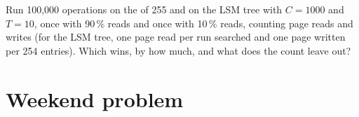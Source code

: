 \begin{exercise}[$\star\star\star$]\label{exo:b3:database-storage:12}
Run 100,000 operations on the  of  255 and on the LSM tree with $C = 1000$ and $T = 10$, once with 90\,\% reads and once with 10\,\% reads, counting page reads and writes (for the LSM tree, one page read per run searched and one page written per 254 entries). Which wins, by how much, and what does the count leave out?
\end{exercise}

\section{Weekend problem}\label{sec:b3:database-storage:problem}

